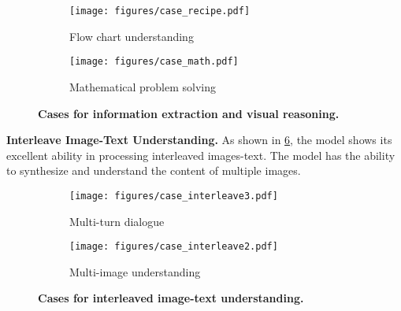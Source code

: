 \begin{figure}[h]
    \centering
    \begin{subfigure}{0.95\textwidth}
        \centering
        \texttt{[image: figures/case\_recipe.pdf]}
        \vspace{-8pt}
        \caption{Flow chart understanding}
        \label{fig:case_recipe}
    \end{subfigure}
    \begin{subfigure}{0.95\textwidth}
        \centering
        \texttt{[image: figures/case\_math.pdf]}
        \vspace{-8pt}
        \caption{Mathematical problem solving}
        \label{fig:case_math}
    \end{subfigure}
    \caption{
    \textbf{Cases for information extraction and visual reasoning.}
    }
    \label{fig-exp_cases_it_reasoning}
\end{figure}


\textbf{Interleave Image-Text Understanding.}
As shown in \cref{fig-exp_case_it_interleave}, the model shows its excellent ability in processing interleaved images-text.
The model has the ability to synthesize and understand the content of multiple images.

\begin{figure}[h]
    \centering
    \begin{subfigure}{0.95\textwidth}
        \centering
        \texttt{[image: figures/case\_interleave3.pdf]}
        \vspace{-8pt}
        \caption{Multi-turn dialogue}
        \label{fig:case_interleave3}
    \end{subfigure}
    \begin{subfigure}{0.95\textwidth}
        \centering
        \texttt{[image: figures/case\_interleave2.pdf]}
        \vspace{-8pt}
        \caption{Multi-image understanding}
        \label{fig:case_interleave2}
    \end{subfigure}
    \caption{
    \textbf{Cases for interleaved image-text understanding.}
    }
    \label{fig-exp_case_it_interleave}
\end{figure}

